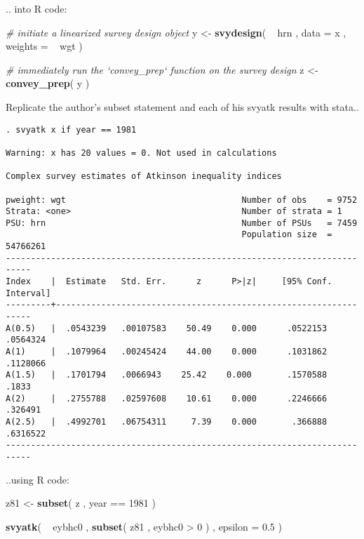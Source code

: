 \documentclass[]{book}
\newenvironment{Shaded}{\begin{snugshade}}{\end{snugshade}}
\newcommand{\KeywordTok}[1]{\textcolor[rgb]{0.13,0.29,0.53}{\textbf{{#1}}}}
\newcommand{\DataTypeTok}[1]{\textcolor[rgb]{0.13,0.29,0.53}{{#1}}}
\newcommand{\DecValTok}[1]{\textcolor[rgb]{0.00,0.00,0.81}{{#1}}}
\newcommand{\FloatTok}[1]{\textcolor[rgb]{0.00,0.00,0.81}{{#1}}}
\newcommand{\StringTok}[1]{\textcolor[rgb]{0.31,0.60,0.02}{{#1}}}
\newcommand{\CommentTok}[1]{\textcolor[rgb]{0.56,0.35,0.01}{\textit{{#1}}}}
\newcommand{\NormalTok}[1]{{#1}}
\theoremstyle{definition}
\theoremstyle{definition}
\theoremstyle{remark}
\begin{document}
.. into R code:

\begin{Shaded}
\begin{Highlighting}[]
\CommentTok{# initiate a linearized survey design object}
\NormalTok{y <-}\StringTok{ }\KeywordTok{svydesign}\NormalTok{( ~}\StringTok{ }\NormalTok{hrn , }\DataTypeTok{data =} \NormalTok{x , }\DataTypeTok{weights =} \NormalTok{~}\StringTok{ }\NormalTok{wgt )}

\CommentTok{# immediately run the `convey_prep` function on the survey design}
\NormalTok{z <-}\StringTok{ }\KeywordTok{convey_prep}\NormalTok{( y )}
\end{Highlighting}
\end{Shaded}

Replicate the author's subset statement and each of his svyatk results
with stata..

\begin{verbatim}
. svyatk x if year == 1981
 
Warning: x has 20 values = 0. Not used in calculations

Complex survey estimates of Atkinson inequality indices
 
pweight: wgt                                   Number of obs    = 9752
Strata: <one>                                  Number of strata = 1
PSU: hrn                                       Number of PSUs   = 7459
                                               Population size  = 54766261
---------------------------------------------------------------------------
Index    |  Estimate   Std. Err.      z      P>|z|     [95% Conf. Interval]
---------+-----------------------------------------------------------------
A(0.5)   |  .0543239   .00107583    50.49    0.000      .0522153   .0564324
A(1)     |  .1079964   .00245424    44.00    0.000      .1031862   .1128066
A(1.5)   |  .1701794   .0066943    25.42    0.000       .1570588      .1833
A(2)     |  .2755788   .02597608    10.61    0.000      .2246666    .326491
A(2.5)   |  .4992701   .06754311     7.39    0.000       .366888   .6316522
---------------------------------------------------------------------------
\end{verbatim}

..using R code:

\begin{Shaded}
\begin{Highlighting}[]
\NormalTok{z81 <-}\StringTok{ }\KeywordTok{subset}\NormalTok{( z , year ==}\StringTok{ }\DecValTok{1981} \NormalTok{)}

\KeywordTok{svyatk}\NormalTok{( ~}\StringTok{ }\NormalTok{eybhc0 , }\KeywordTok{subset}\NormalTok{( z81 , eybhc0 >}\StringTok{ }\DecValTok{0} \NormalTok{) , }\DataTypeTok{epsilon =} \FloatTok{0.5} \NormalTok{)}
\end{Highlighting}
\end{Shaded}
\end{document}
